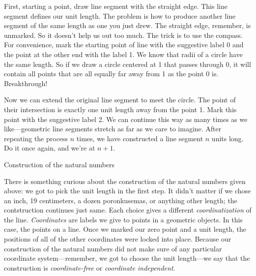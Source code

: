 First, starting a point, draw line segment with the straight edge. This line segment defines our unit length. The problem is how to produce another line segment of the same length as one you just drew. The straight edge, remember, is unmarked. So it doesn't help us out too much. The trick is to use the compass. For convenience, mark the starting point of line with the suggestive label \textsf{0} and the point at the other end with the label \textsf{1}. We know that radii of a circle have the same length. So if we draw a circle centered at \textsf{1} that passes through \textsf{0}, it will contain all points that are all equally far away from \textsf{1} as the point \textsf{0} is. Breakthrough!

Now we can extend the original line segment to meet the circle. The point of their intersection is exactly one unit length away from the point \textsf{1}. Mark this point with the suggestive label \textsf{2}. We can continue this way as many times as we like---geometric line segments stretch as far as we care to imagine. After repeating the process $n$ times, we have constructed a line segment $n$ units long. Do it once again, and we're at $n+1$.

\begin{marginfigure}
  
  \caption{\label{fig:mb-natural-numbers-construction} Construction of the natural numbers}
\end{marginfigure}

There is something curious about the construction of the natural numbers given above: we got to pick the unit length in the first step. It didn't matter if we chose an inch, 19 centimeters, a dozen poronkusemas, or anything other length; the contstruction continues just same. Each choice gives a different \emph{coordinatization} of the line. \emph{Coordinates} are labels we give to points in a geometric objects. In this case, the points on a line. Once we marked our zero point and a unit length, the positions of all of the other coordinates were locked into place. Because our construction of the natural numbers did not make sure of any particular coordinate system---remember, we got to choose the unit length---we say that the construction is \emph{coordinate-free} or \emph{coordinate independent}.

